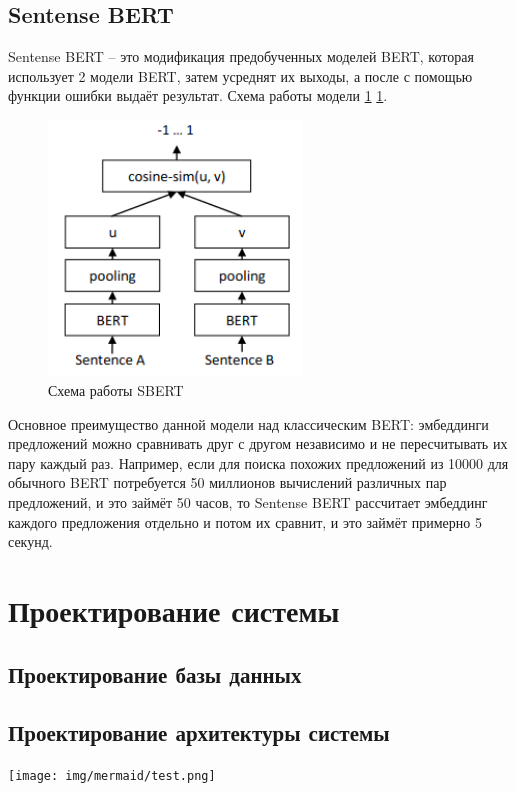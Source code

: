 \documentclass[PI, VKR]{HSEUniversity}
\begin{document}
\section{Sentense BERT}
\label{sec:orgc527cc8}
Sentense BERT \autocite{reimers-2019-sentence-bert} -- это модификация предобученных моделей BERT, которая использует 2 модели BERT, затем усреднят их выходы, а после с помощью функции ошибки выдаёт результат. Схема работы модели \ref{fig:sbert} \ref{fig:sbert}.
\begin{figure}[hbp]
\centering
\includegraphics[width=0.6\textwidth]{img/sbert.png}
\caption{\label{fig:sbert}Схема работы SBERT}
\end{figure}
Основное преимущество данной модели над классическим BERT: эмбеддинги предложений можно сравнивать друг с другом независимо и не пересчитывать их пару каждый раз. Например, если для поиска похожих предложений из 10000 для обычного BERT потребуется 50 миллионов вычислений различных пар предложений, и это займёт 50 часов, то Sentense BERT рассчитает эмбеддинг каждого предложения отдельно и потом их сравнит, и это займёт примерно 5 секунд.
\chapter{Проектирование системы}
\label{sec:orga64e340}
\section{Проектирование базы данных}
\label{sec:orgd1afeb9}

\section{Проектирование архитектуры системы}
\label{sec:org002b2c7}
\begin{center}
\texttt{[image: img/mermaid/test.png]}
\end{center}
\end{document}
